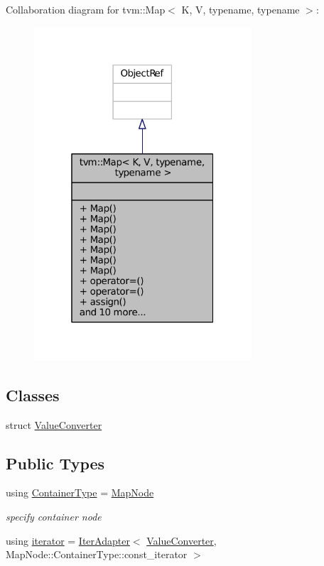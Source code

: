 Collaboration diagram for tvm\+:\+:Map$<$ K, V, typename, typename $>$\+:
\nopagebreak
\begin{figure}[H]
\begin{center}
\leavevmode
\includegraphics[width=229pt]{classtvm_1_1Map__coll__graph}
\end{center}
\end{figure}
\subsection*{Classes}
\begin{DoxyCompactItemize}
\item 
struct \hyperlink{structtvm_1_1Map_1_1ValueConverter}{Value\+Converter}
\end{DoxyCompactItemize}
\subsection*{Public Types}
\begin{DoxyCompactItemize}
\item 
using \hyperlink{classtvm_1_1Map_a032205a9ae4e6f2d945837e7185b3d1a}{Container\+Type} = \hyperlink{classtvm_1_1MapNode}{Map\+Node}
\begin{DoxyCompactList}\small\item\em specify container node \end{DoxyCompactList}\item 
using \hyperlink{classtvm_1_1Map_ac692b6c03df9de0b1d49f719bf659ee1}{iterator} = \hyperlink{classtvm_1_1IterAdapter}{Iter\+Adapter}$<$ \hyperlink{structtvm_1_1Map_1_1ValueConverter}{Value\+Converter}, Map\+Node\+::\+Container\+Type\+::const\+\_\+iterator $>$
\end{DoxyCompactItemize}
